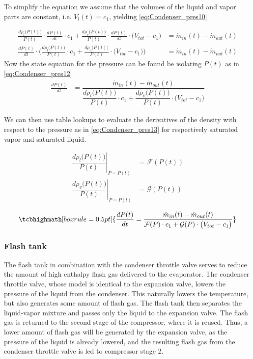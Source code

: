To simplify the equation we assume that the volumes of the liquid and vapor parts are constant, i.e. $ V_l(t) = c_1$, yielding \cref{eq:Condenser_pres10}

\begin{align}
		\frac{d \rho_{l}\bigl(P(t)\bigr)}{P(t)} \cdot \frac{dP(t)}{dt} \cdot c_1 +  \frac{d \rho_{v}\bigl(P(t)\bigr)}{P(t)} \cdot \frac{dP(t)}{dt} \cdot \bigl(V_{tot} - c_1\bigr) & = \dot{m}_{in}(t) - \dot{m}_{out}(t) \label{eq:Condenser_pres10} \\
		 \frac{dP(t)}{dt} \cdot \Biggl( \frac{d \rho_{l}\bigl(P(t)\bigr)}{P(t)} \cdot c_1 +  \frac{d \rho_{v}\bigl(P(t)\bigr)}{P(t)} \cdot \bigl(V_{tot} - c_1\bigr) \Biggr) & = \dot{m}_{in}(t) - \dot{m}_{out}(t) \label{eq:Condenser_pres11}
\end{align}
Now the state equation for the pressure can be found be isolating $ P(t) $ as in \cref{eq:Condenser_pres12}
\begin{align}
	\frac{dP(t)}{dt} & = \dfrac{\dot{m}_{in}(t) - \dot{m}_{out}(t)}{ \dfrac{d \rho_{l}\bigl(P(t)\bigr)}{P(t)} \cdot c_1 +  \dfrac{d \rho_{v}\bigl(P(t)\bigr)}{P(t)} \cdot \bigl(V_{tot} - c_1\bigr) } \label{eq:Condenser_pres12}
\end{align}

We can then use table lookups to evaluate the derivatives of the density with respect to the pressure as in \cref{eq:Condenser_pres13} for respectively saturated vapor and saturated liquid.

\begin{align}
		\left. \dfrac{d \rho_l\bigl(P(t)\bigr)}{P(t)} \right |_{P = P(t)} & = \mathcal{F}(P(t)) \label{eq:Condenser_pres13} \\
		\left. \dfrac{d \rho_v\bigl(P(t)\bigr)}{P(t)} \right |_{P = P(t)} & = \mathcal{G}(P(t)) \label{eq:Condenser_pres14}
\end{align}

\begin{equation}
	\tcbhighmath[boxrule = 0.5pt]{\frac{dP(t)}{dt} = \dfrac{\dot{m}_{in}(t) - \dot{m}_{out}(t)}{ \mathcal{F}(P) \cdot c_1 +  \mathcal{G}(P) \cdot \bigl(V_{tot} - c_1\bigr) }}
\end{equation}

\subsubsection{Flash tank}
The flash tank in combination with the condenser throttle valve serves to reduce the amount of high enthalpy flash gas delivered to the evaporator. The condenser throttle valve, whose model is identical to the expansion valve, lowers the pressure of the liquid from the condenser. This naturally lowers the temperature, but also generates some amount of flash gas. The flash tank then separates the liquid-vapor mixture and passes only the liquid to the expansion valve. The flash gas is returned to the second stage of the compressor, where it is reused. Thus, a lower amount of flash gas will be generated by the expansion valve, as the pressure of the liquid is already lowered, and the resulting flash gas from the condenser throttle valve is led to compressor stage 2.

